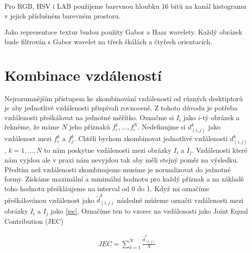 \documentclass[czech,BP]{thesiskiv}
\begin{document}
Pro RGB, HSV i LAB použijeme barevnou hloubku 16 bitů na kanál histogramu v jejich příslušném barevném prostoru. 

Jako reprezentace textur budou použity Gabor a Haar wavelety. Každý obrázek bude filtrován s Gabor wavelet na třech škálách a čtyřech orientacích. 



\section{Kombinace vzdáleností}
Nejrozumnějším přístupem ke zkombinování vzdáleností od různých desktiptorů je aby jednotlivé vzdálenosti přispívali rovnoceně. Z tohoto důvodu je potřeba vzdálenosti přeškálovat na jednotné měřítko. Označme si $I_i$ jako $i$-tý obrázek a řekněme, že máme $N$ jeho příznaků $f_i^1, ..., f_i^N$. Nedefinujme si $d_{(i,j)}^k$ jako vzdálenost mezi $f_i^k$ a $f_j^k$. Chtěli bychom zkombinovat jednotlivé vzdálenosti $d_{(i,j)}^k$ , $k=1, ..., N$ to nám poskytne vzdálenosti mezi obrázky $I_i$ a $I_j$. Vzdálenosti které nám vyjdou  ale v praxi nám nevyjdou tak aby měli stejný poměr na výsledku. Předtím než vzdálenosti zkombinujeme musíme je normalizovat do jednotné formy. Získáme maximální a minimální hodnotu pro každý příznak a na základě toho hodnotu přeškláujeme na interval od 0 do 1. Když mi označíme přeškálovánou vzdálenost jako ${\tilde{d}_{(i,j)}^k}$ následně můžeme označit vzdálenosti mezi obrázky $I_i$ a $I_j$ jako \eqref{jec}. Označíme ten to vzorec na vzdálenosti jako Joint Equal Contribution (JEC)  


\begin{align}
   \label{jec} JEC = \sum_{k=1}^N\frac{\tilde{d}_{(i,j)}^k}{N}
\end{align}
\end{document}
